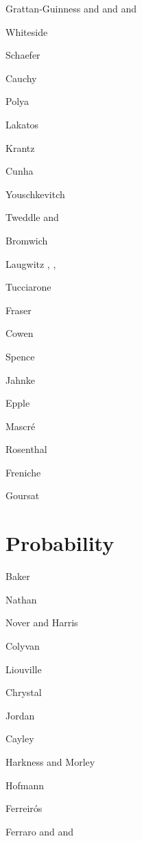 \documentclass{article}
\begin{document}
Grattan-Guinness \cite{MR0497690} and \cite{MR1263061} and \cite{gg} and \cite{bolzano}

Whiteside \cite{whiteside}

Schaefer \cite{schaefer1986}

Cauchy \cite{cours}

Polya \cite{polyaI}

Lakatos \cite{lakatos}

Krantz \cite{MR2026311}

Cunha \cite{cunha}

Youschkevitch \cite{youschkevitch}

Tweddle \cite{tweddle} and \cite{MR1996414}

Bromwich \cite[p.~74, Art. 28]{bromwich}

Laugwitz \cite{laugwitz1989}, \cite{laugwitz2000}, \cite{laugwitz2008}

Tucciarone \cite{tucciarone}

Fraser \cite{fraser}

Cowen \cite{MR602844}

Spence \cite{spence}

Jahnke \cite{jahnke}

Epple \cite{epple}

Mascr\'e \cite{mascre}

Rosenthal \cite{MR883287}

Freniche \cite{MR2663251}

Goursat \cite[p.~348]{goursat}

\section{Probability}
Baker \cite{baker}

Nathan \cite{nathan}

Nover and Harris \cite{nover}

Colyvan \cite{colyvan}

Liouville \cite[pp.~74--75]{lutzen}

Chrystal \cite[p.~118]{chrystal}

Jordan \cite[p.~277, Theorem 291]{jordan}

Cayley \cite[a]{cayley}

Harkness and Morley \cite[p.~66]{harkness}

Hofmann \cite{hofmann}

Ferreir\'os \cite{ferreiros}

Ferraro \cite{MR2368303} and \cite{ferraro} and \cite{leibniz}
\end{document}
